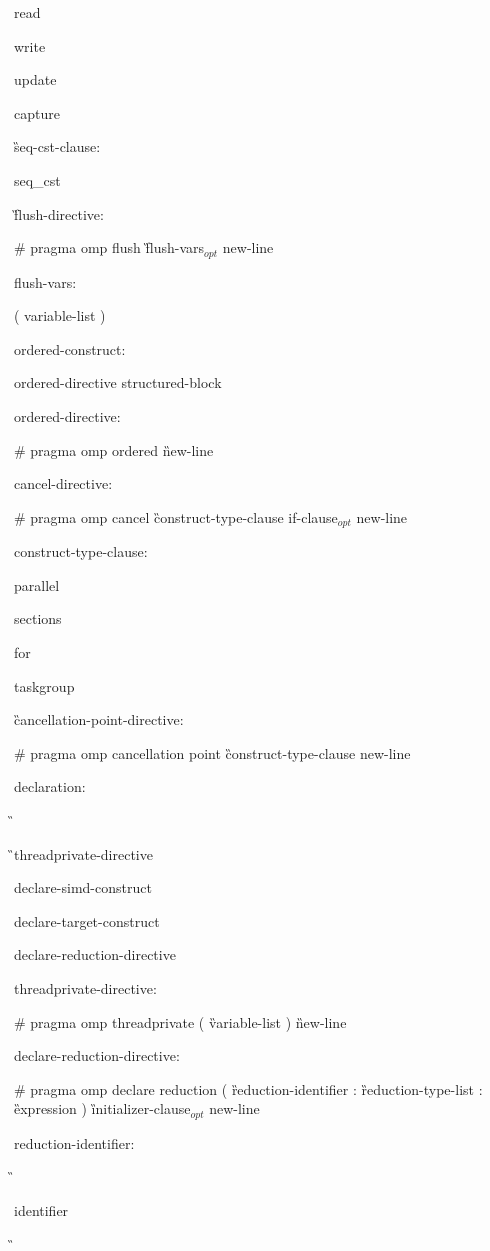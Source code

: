 {\C\I read

\I write

\I update

\I capture

\G seq-cst-clause:

\C\I seq\_cst

\G flush-directive:

\C\I \# pragma omp flush \G flush-vars$_{opt}$ new-line

flush-vars:

\I ( variable-list )

ordered-construct:

\I ordered-directive structured-block

ordered-directive:

\C\I \# pragma omp ordered \G new-line

cancel-directive:

\C\I \# pragma omp cancel \G construct-type-clause if-clause$_{opt}$ new-line

construct-type-clause:

\C\I parallel

\I sections

\I for

\I taskgroup

\G cancellation-point-directive:

\C\I \# pragma omp cancellation point \G construct-type-clause new-line

declaration:

\G{}

\G\I threadprivate-directive

\I declare-simd-construct

\I declare-target-construct

\I declare-reduction-directive

threadprivate-directive:

\C\I \# pragma omp threadprivate ( \G variable-list \C ) \G new-line

declare-reduction-directive:

\C\I \# pragma omp declare reduction ( \G reduction-identifier \C : \G reduction-type-list \C : \G expression \C ) \G initializer-clause$_{opt}$ new-line

reduction-identifier: 

\G\cspecificstart

\I identifier 

\G\cspecificend

}

